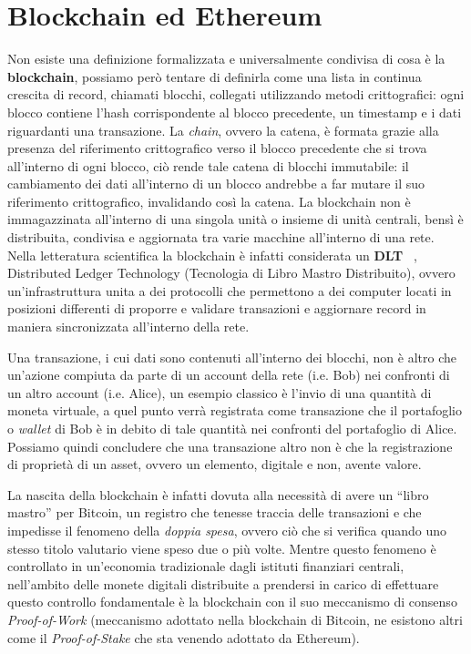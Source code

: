 \section{Blockchain ed Ethereum}
\label{sub:bc}
Non esiste una definizione formalizzata e universalmente condivisa di cosa è la
\textbf{blockchain}, possiamo però tentare di definirla come una lista in continua 
crescita di record, chiamati blocchi, collegati utilizzando metodi crittografici: 
ogni blocco contiene l'hash corrispondente al blocco precedente, un timestamp e i 
dati riguardanti una transazione. 
La \emph{chain}, ovvero la catena, è formata grazie alla presenza del riferimento 
crittografico verso il blocco precedente che si trova all'interno di ogni blocco, 
ciò rende tale catena di blocchi immutabile: il cambiamento dei dati all'interno di 
un blocco andrebbe a far mutare il suo riferimento crittografico, invalidando così la catena.
La blockchain non è immagazzinata all'interno di una singola unità o insieme di 
unità centrali, bensì è distribuita, condivisa e aggiornata tra varie macchine 
all'interno di una rete.
Nella letteratura scientifica la blockchain è infatti considerata un \textbf{DLT} ~\cite{asv-bdg-19},
Distributed Ledger Technology (Tecnologia di Libro Mastro Distribuito), ovvero
un'infrastruttura unita a dei protocolli che permettono a dei computer locati in
posizioni differenti di proporre e validare transazioni e aggiornare record in maniera
sincronizzata all'interno della rete.

Una transazione, i cui dati sono contenuti all'interno dei blocchi, non è 
altro che un'azione compiuta da parte di un account della rete (i.e. Bob) nei confronti 
di un altro account (i.e. Alice), un esempio classico è l'invio di una quantità di moneta 
virtuale, a quel punto verrà registrata come transazione che il portafoglio o \emph{wallet}
di Bob è in debito di tale quantità nei confronti del portafoglio di Alice.
Possiamo quindi concludere che una transazione altro non è che la registrazione di proprietà 
di un asset, ovvero un elemento, digitale e non, avente valore.

La nascita della blockchain è infatti dovuta alla necessità di avere un “libro mastro” per 
Bitcoin, un registro che tenesse traccia delle transazioni e che impedisse il fenomeno della 
\emph{doppia spesa}, ovvero ciò che si verifica quando uno stesso titolo valutario viene speso 
due o più volte. Mentre questo fenomeno è controllato in un'economia tradizionale dagli 
istituti finanziari centrali, nell'ambito delle monete digitali distribuite a prendersi 
in carico di effettuare questo controllo fondamentale è la blockchain con il suo 
meccanismo di consenso \emph{Proof-of-Work} 
(meccanismo adottato nella blockchain di Bitcoin, 
ne esistono altri come il \emph{Proof-of-Stake} che sta venendo adottato da Ethereum).

